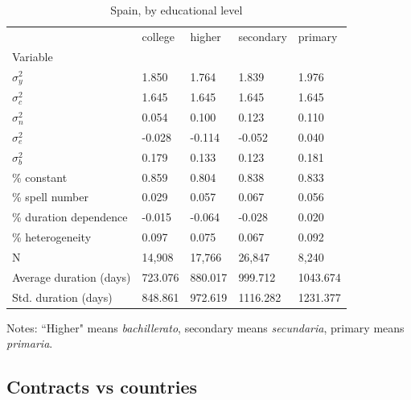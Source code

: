 \documentclass[12pt]{article}
\theoremstyle{definition}
\theoremstyle{remark}
\begin{document}
\begin{appendices}
\begin{table}[htbb!]
    \centering
    \caption{Spain, by educational level}
    \begin{tabular}{lllll}
\toprule
 & college & higher & secondary & primary \\
Variable &  &  &  &  \\
\midrule
$\sigma^{2}_y$ & 1.850 & 1.764 & 1.839 & 1.976 \\
$\sigma^{2}_c$ & 1.645 & 1.645 & 1.645 & 1.645 \\
$\sigma^{2}_n$ & 0.054 & 0.100 & 0.123 & 0.110 \\
$\sigma^{2}_e$ & -0.028 & -0.114 & -0.052 & 0.040 \\
$\sigma^{2}_b$ & 0.179 & 0.133 & 0.123 & 0.181 \\
\midrule
\% constant & 0.859 & 0.804 & 0.838 & 0.833 \\
\% spell number & 0.029 & 0.057 & 0.067 & 0.056 \\
\% duration dependence & -0.015 & -0.064 & -0.028 & 0.020 \\
\% heterogeneity & 0.097 & 0.075 & 0.067 & 0.092 \\
\hline \hline
N & 14,908 & 17,766 & 26,847 & 8,240 \\
Average duration (days) & 723.076 & 880.017 & 999.712 & 1043.674 \\
Std. duration (days) & 848.861 & 972.619 & 1116.282 & 1231.377 \\
\bottomrule
\end{tabular}

\end{table}

Notes: ``Higher" means \textit{bachillerato}, secondary means \textit{secundaria}, primary means \textit{primaria}.

\clearpage

\subsection{Contracts vs countries}


\end{appendices}
\end{document}
